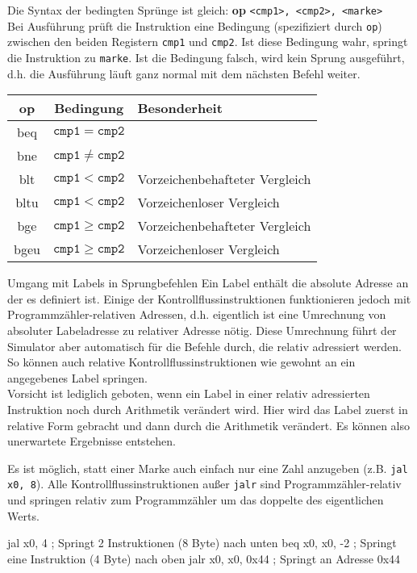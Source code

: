 Die Syntax der bedingten Sprünge ist gleich: \textbf{op} \texttt{<cmp1>, <cmp2>, <marke>}\\
Bei Ausführung prüft die Instruktion eine Bedingung (spezifiziert durch \texttt{op}) zwischen den beiden Registern \texttt{cmp1} und \texttt{cmp2}. Ist diese Bedingung wahr, springt die Instruktion zu \texttt{marke}. Ist die Bedingung falsch, wird kein Sprung ausgeführt, d.h. die Ausführung läuft ganz normal mit dem nächsten Befehl weiter.\\
\begin{tabular}{|c|c|l|}
	\hline
	op & Bedingung & Besonderheit\\
	\hline
	beq & $\mathtt{cmp1} = \mathtt{cmp2}$ & \\
	\hline
	bne & $\mathtt{cmp1} \ne \mathtt{cmp2}$ & \\
	\hline
	blt & $\mathtt{cmp1} < \mathtt{cmp2}$ & Vorzeichenbehafteter Vergleich\\
	\hline
	bltu & $\mathtt{cmp1} < \mathtt{cmp2}$ & Vorzeichenloser Vergleich\\
	\hline
	bge & $\mathtt{cmp1} \ge \mathtt{cmp2}$ & Vorzeichenbehafteter Vergleich\\
	\hline
	bgeu & $\mathtt{cmp1} \ge \mathtt{cmp2}$ & Vorzeichenloser Vergleich\\
	\hline
\end{tabular}

\begin{infoblock}{Umgang mit Labels in Sprungbefehlen}
  Ein Label enthält die absolute Adresse an der es definiert ist. Einige der
  Kontrollflussinstruktionen funktionieren jedoch mit Programmzähler-relativen
  Adressen, d.h. eigentlich ist eine Umrechnung von absoluter Labeladresse zu
  relativer Adresse nötig. Diese Umrechnung führt der Simulator aber automatisch
  für die Befehle durch, die relativ adressiert werden. So können auch relative
  Kontrollflussinstruktionen wie gewohnt an ein angegebenes Label springen.\\
	Vorsicht ist lediglich geboten, wenn ein Label in einer relativ adressierten
	Instruktion noch durch Arithmetik verändert wird. Hier wird das Label zuerst
	in relative Form gebracht und dann durch die Arithmetik verändert. Es können
	also unerwartete Ergebnisse entstehen.
\end{infoblock}

\begin{warningblock}
	Es ist möglich, statt einer Marke auch einfach nur eine Zahl anzugeben (z.B. \texttt{jal x0, 8}).
	Alle Kontrollflussinstruktionen außer \texttt{jalr} sind Programmzähler-relativ und springen relativ zum Programmzähler um das doppelte des eigentlichen Werts.\\
\begin{riscv}
jal x0, 4 ; Springt 2 Instruktionen (8 Byte) nach unten
beq x0, x0, -2 ; Springt eine Instruktion (4 Byte) nach oben
jalr x0, x0, 0x44 ; Springt an Adresse 0x44
\end{riscv}
\end{warningblock}


